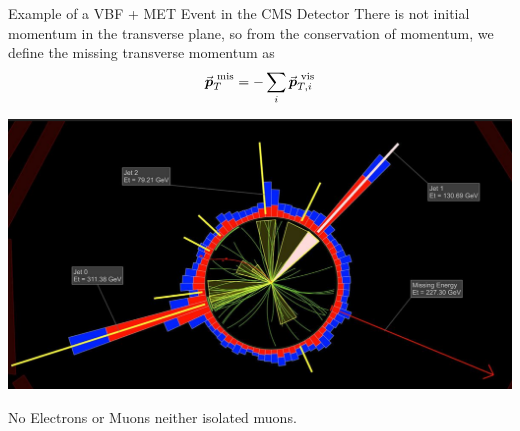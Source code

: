 \documentclass{../../bredelebeamer}
\begin{document}
\begin{frame}{Example of a VBF + MET Event in the CMS Detector}
    There is not initial momentum in the transverse plane, so from the conservation of momentum, we define the missing transverse momentum as
    $$
        \va*{p}_T^{\text{ mis}} = - \sum_{i} \va*{p}_{T,i}^{\text{ vis}}
    $$
    \begin{center}
        \includegraphics[width=.95\linewidth]{../Images/real_vbf_event.png}
    \end{center}
    No Electrons or Muons neither isolated muons. 
\end{frame}
\end{document}
